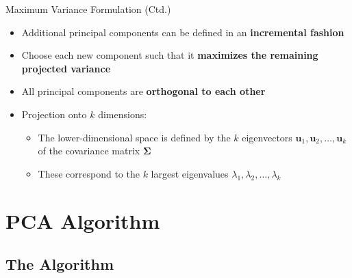 \begin{frame}{Maximum Variance Formulation (Ctd.)}{}
	\begin{itemize}
		\item Additional principal components can be defined in an \textbf{incremental fashion}
		\item Choose each new component such that it \textbf{maximizes the remaining projected variance} 
		\item All principal components are \textbf{orthogonal to each other}
		\item Projection onto $k$ dimensions:
		\begin{itemize}
			\item The lower-dimensional space is defined by the $k$ eigenvectors $\bm{u}_1, \bm{u}_2, \dots, \bm{u}_k$ of the
				covariance matrix $\bm{\Sigma}$
			\item These correspond to the $k$ largest eigenvalues $\lambda_1, \lambda_2, \dots, \lambda_k$
		\end{itemize}
	\end{itemize}
\end{frame}


\section{PCA Algorithm}

\subsection{The Algorithm}

\begin{frame}[plain]{}{}
	
\end{frame}


